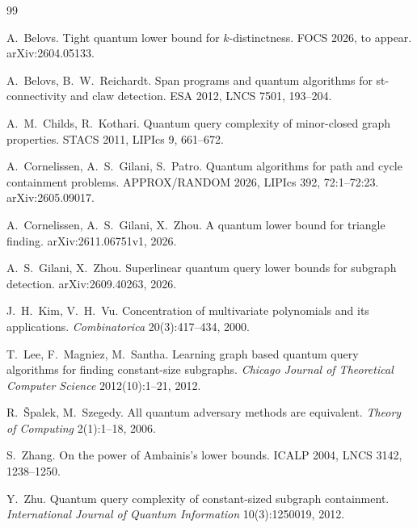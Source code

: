 \documentclass[11pt]{article}
\theoremstyle{remark}
\begin{document}
\begin{thebibliography}{99}\small

 A.~Belovs. Tight quantum lower bound for $k$-distinctness. FOCS 2026, to appear. arXiv:2604.05133.

 A.~Belovs, B.~W.~Reichardt. Span programs and quantum algorithms for st-connectivity and claw detection. ESA 2012, LNCS 7501, 193--204.

 A.~M.~Childs, R.~Kothari. Quantum query complexity of minor-closed graph properties. STACS 2011, LIPIcs 9, 661--672.

 A.~Cornelissen, A.~S.~Gilani, S.~Patro. Quantum algorithms for path and cycle containment problems. APPROX/RANDOM 2026, LIPIcs 392, 72:1--72:23. arXiv:2605.09017.

 A.~Cornelissen, A.~S.~Gilani, X.~Zhou. A quantum lower bound for triangle finding. arXiv:2611.06751v1, 2026.

 A.~S.~Gilani, X.~Zhou. Superlinear quantum query lower bounds for subgraph detection. arXiv:2609.40263, 2026.

 J.~H.~Kim, V.~H.~Vu. Concentration of multivariate polynomials and its applications. \emph{Combinatorica} 20(3):417--434, 2000.

 T.~Lee, F.~Magniez, M.~Santha. Learning graph based quantum query algorithms for finding constant-size subgraphs. \emph{Chicago Journal of Theoretical Computer Science} 2012(10):1--21, 2012.

 R.~\v{S}palek, M.~Szegedy. All quantum adversary methods are equivalent. \emph{Theory of Computing} 2(1):1--18, 2006.

 S.~Zhang. On the power of Ambainis's lower bounds. ICALP 2004, LNCS 3142, 1238--1250.

 Y.~Zhu. Quantum query complexity of constant-sized subgraph containment. \emph{International Journal of Quantum Information} 10(3):1250019, 2012.

\end{thebibliography}
\end{document}
